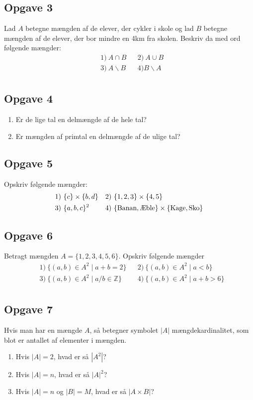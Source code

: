 \subsection*{Opgave 3}
Lad $A$ betegne mængden af de elever, der cykler i skole og lad $B$ betegne mængden af de elever, der bor mindre en 4km fra skolen. Beskriv da med ord følgende mængder:
\begin{align*}
	&1) \ A \cap B    &&2) \  A \cup B   \\
	&3) \ A \backslash B  && 4) B \backslash A\\
\end{align*}

\subsection*{Opgave 4}
\begin{enumerate}[label=\roman*)]
	\item Er de lige tal en delmængde af de hele tal? 
	\item Er mængden af primtal en delmængde af de ulige tal?
\end{enumerate}
\subsection*{Opgave 5}
Opskriv følgende mængder:
\begin{align*}
	&1) \ \{c\} \times \{b,d\}    &&2) \ \{1,2,3\} \times \{4,5\}   \\
	&3) \  \{a,b,c\}^2   &&4) \ \{\textnormal{Banan}, \textnormal{Æble}\} \times \{\textnormal{Kage}, \textnormal{Sko}\}   \\	
\end{align*}
\subsection*{Opgave 6}
Betragt mængden $A = \{1,2,3,4,5,6\}$. Opskriv følgende mængder
\begin{align*}
	&1) \  \{(a,b) \in A^2 \mid a + b = 2 \}    &&2) \ \{(a,b) \in A^2 \mid a < b \}       \\
	&3) \  \{(a,b) \in A^2 \mid a/b \in \mathbb{Z} \}      &&4) \   \{(a,b) \in A^2 \mid a + b > 6 \}     \\
\end{align*}
\subsection*{Opgave 7}
Hvis man har en mængde $A$, så betegner symbolet $|A|$ mængdekardinalitet, som blot er antallet af elementer i mængden. 
\begin{enumerate}[label = \roman*)]
	\item Hvis $|A| = 2$, hvad er så $|A^2|$?
	\item Hvis $|A| = n$, hvad er så $|A|^2$?
	\item Hvis $|A| = n$ og $|B| = M$, hvad er så $|A \times B|$?
\end{enumerate}
